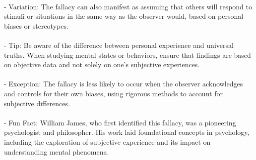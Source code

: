 \documentclass[a4paper,12pt,single,pdftex]{scrbook}
\begin{document}
    
      
    \\

    
      - Variation: The fallacy can also manifest as assuming that others will respond to stimuli or situations in the same way as the observer would, based on personal biases or stereotypes.
    \\

    
      
    \\

    
      - Tip: Be aware of the difference between personal experience and universal truths. When studying mental states or behaviors, ensure that findings are based on objective data and not solely on one's subjective experiences.
    \\

    
      
    \\

    
      - Exception: The fallacy is less likely to occur when the observer acknowledges and controls for their own biases, using rigorous methods to account for subjective differences.
    \\

    
      
    \\

    
      - Fun Fact: William James, who first identified this fallacy, was a pioneering psychologist and philosopher. His work laid foundational concepts in psychology, including the exploration of subjective experience and its impact on understanding mental phenomena.
    \\
\end{document}
